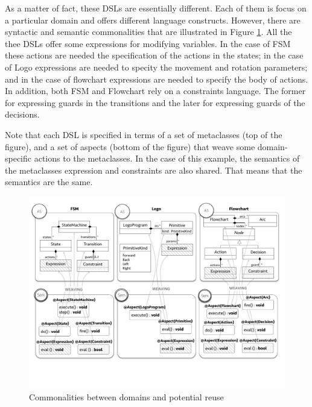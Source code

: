 As a matter of fact, these DSLs are essentially different. Each of them is focus on a particular domain and offers different language constructs. However, there are syntactic and semantic commonalities that are illustrated in Figure \ref{fig:domains}. All the thee DSLs offer some expressions for modifying variables. In the case of FSM these actions are needed the specification of the actions in the states; in the case of Logo expressions are needed to specity the movement and rotation parameters; and in the case of flowchart expressions are needed to specify the body of actions. In addition, both FSM and Flowchart rely on a constraints language. The former for expressing guards in the transitions and the later for expressing guards of the decisions.

Note that each DSL is specified in terms of a set of metaclasses (top of the figure), and a set of aspects (bottom of the figure) that weave some domain-specific actions to the metaclasses. In the case of this example, the semantics of the metaclasses expression and constraints are also shared. That means that the semantics are the same. 

\begin{figure}
\centering
\includegraphics[width=1\linewidth]{images/domains-fig.pdf}
\caption{Commonalities between domains and potential reuse}
\label{fig:domains}
\end{figure}


